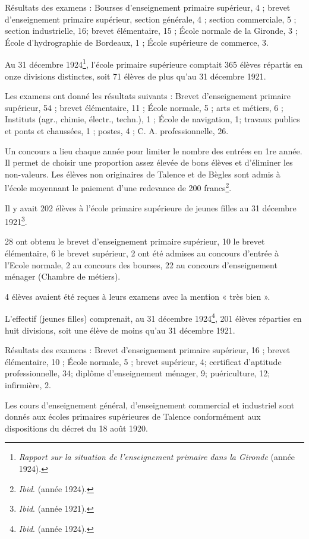 \documentclass[a4paper,11pt]{book}
\begin{document}
Résultats des examens : Bourses d'enseignement primaire supérieur, 4 ; brevet d'enseignement primaire supérieur, section générale, 4 ; section commerciale, 5 ; section industrielle, 16; brevet élémentaire, 15 ; École normale de la Gironde, 3 ; École d'hydrographie de Bordeaux, 1 ; École supérieure de commerce, 3.

Au 31 décembre 1924\footnote{\textit{Rapport sur la situation de l'enseignement primaire dans la Gironde} (année 1924).}, l'école primaire supérieure comptait 365 élèves répartis en onze divisions distinctes, soit 71 élèves de plus qu'au 31 décembre 1921.

Les examens ont donné les résultats suivants : Brevet d'enseignement primaire supérieur, 54 ; brevet élémentaire, 11 ; École normale, 5 ; arts et métiers, 6 ; Instituts (agr., chimie, électr., techn.), 1 ; École de navigation, 1; travaux publics et ponts et chaussées, 1 ; postes, 4 ; C. A. professionnelle, 26.

Un concours a lieu chaque année pour limiter le nombre des entrées en 1re année. Il permet de choisir une proportion assez élevée de bons élèves et d'éliminer les non-valeurs. Les élèves non originaires de Talence et de Bègles sont admis à l'école moyennant le paiement d'une redevance de 200 francs\footnote{\textit{Ibid}. (année 1924).}.

Il y avait 202 élèves à l'école primaire supérieure de jeunes filles au 31 décembre 1921\footnote{\textit{Ibid}. (année 1921).}.

28 ont obtenu le brevet d'enseignement primaire supérieur, 10 le brevet élémentaire, 6 le brevet supérieur, 2 ont été admises au concours d'entrée à l'Ecole normale, 2 au concours des bourses, 22 au concours d'enseignement ménager (Chambre de métiers).

4 élèves avaient été reçues à leurs examens avec la mention « très bien ».

L'effectif (jeunes filles) comprenait, au 31 décembre 1924\footnote{\textit{Ibid}. (année 1924).}, 201 élèves réparties en huit divisions, soit une élève
de moins qu'au 31 décembre 1921.

Résultats des examens : Brevet d'enseignement primaire supérieur, 16 ; brevet élémentaire, 10 ; École normale, 5 ; brevet supérieur, 4; certificat d'aptitude professionnelle, 34; diplôme d'enseignement ménager, 9; puériculture, 12; infirmière, 2.

Les cours d'enseignement général, d'enseignement commercial et industriel sont donnés aux écoles primaires supérieures de Talence conformément aux dispositions du décret du 18 août 1920.
\end{document}
